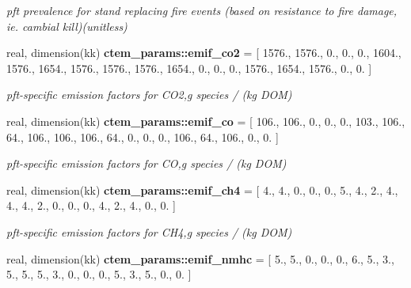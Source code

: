 \begin{DoxyCompactItemize}
\begin{DoxyCompactList}\small\item\em pft prevalence for stand replacing fire events (based on resistance to fire damage, ie. cambial kill)(unitless) \end{DoxyCompactList}\item 
\hypertarget{namespacectem__params_a07af3ba9ecabbbac0d884937d56e1b7a}{}real, dimension(kk) {\bfseries ctem\+\_\+params\+::emif\+\_\+co2} = \mbox{[} 1576., 1576., 0., 0., 0., 1604., 1576., 1654., 1576., 1576., 1576., 1654., 0., 0., 0., 1576., 1654., 1576., 0., 0. \mbox{]}\label{namespacectem__params_a07af3ba9ecabbbac0d884937d56e1b7a}

\begin{DoxyCompactList}\small\item\em pft-\/specific emission factors for C\+O2,g species / (kg D\+O\+M) \end{DoxyCompactList}\item 
\hypertarget{namespacectem__params_ad22701db48fc392e6905ec845347eb82}{}real, dimension(kk) {\bfseries ctem\+\_\+params\+::emif\+\_\+co} = \mbox{[} 106., 106., 0., 0., 0., 103., 106., 64., 106., 106., 106., 64., 0., 0., 0., 106., 64., 106., 0., 0. \mbox{]}\label{namespacectem__params_ad22701db48fc392e6905ec845347eb82}

\begin{DoxyCompactList}\small\item\em pft-\/specific emission factors for C\+O,g species / (kg D\+O\+M) \end{DoxyCompactList}\item 
\hypertarget{namespacectem__params_aa4e0d098146e23e88141b2d5804b6dfe}{}real, dimension(kk) {\bfseries ctem\+\_\+params\+::emif\+\_\+ch4} = \mbox{[} 4., 4., 0., 0., 0., 5., 4., 2., 4., 4., 4., 2., 0., 0., 0., 4., 2., 4., 0., 0. \mbox{]}\label{namespacectem__params_aa4e0d098146e23e88141b2d5804b6dfe}

\begin{DoxyCompactList}\small\item\em pft-\/specific emission factors for C\+H4,g species / (kg D\+O\+M) \end{DoxyCompactList}\item 
\hypertarget{namespacectem__params_a2e0fa2f6a9ef11fc839062a5649e17e7}{}real, dimension(kk) {\bfseries ctem\+\_\+params\+::emif\+\_\+nmhc} = \mbox{[} 5., 5., 0., 0., 0., 6., 5., 3., 5., 5., 5., 3., 0., 0., 0., 5., 3., 5., 0., 0. \mbox{]}\label{namespacectem__params_a2e0fa2f6a9ef11fc839062a5649e17e7}


\end{DoxyCompactItemize}
